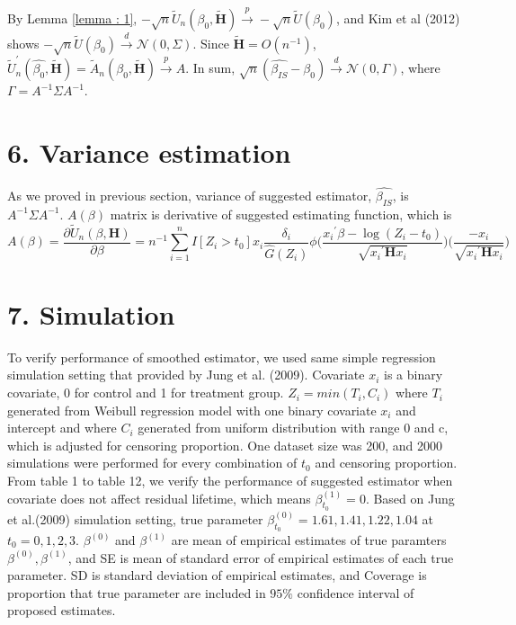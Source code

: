 \documentclass[12pt]{article}
\begin{document}
	\noindent By Lemma \ref {lemma : 1}, $-\sqrt{n}\tilde{U}_n(\beta_0, \tilde{\textbf{H}}) \xrightarrow{p} -\sqrt{n}\tilde{U}(\beta_0)$, and Kim et al (2012) shows $-\sqrt{n}\tilde{U}(\beta_0) \xrightarrow{d} \mathcal{N}(0,\Sigma)$. Since $\tilde{\textbf{H}}=O(n^{-1})$, $\tilde{U}_n^{\prime}(\hat{\beta_0},\tilde{\textbf{H}})=\tilde{A}_n(\beta_0, \tilde{\textbf{H}}) \xrightarrow{p} A$. In sum,
	$\sqrt{n}(\hat{\beta_{IS}}-\beta_0) \xrightarrow{d} \mathcal{N}(0,\Gamma)$, where $\Gamma = A^{-1}\Sigma A^{-1}$.

\section{6. Variance estimation}
	As we proved in previous section, variance of suggested estimator, $\hat{\beta_{IS}}$, is $A^{-1}\Sigma A^{-1}$. $A(\beta)$ matrix is derivative of suggested estimating function, which is
	\begin{equation}
	A(\beta) = \frac{\partial \tilde{U}_n(\beta, \textbf{H})}{\partial \beta} = n^{-1}\sum_{i=1}^{n} I[Z_i>t_0] x_i \frac{\delta_i}{\hat{G}(Z_i)} \phi\bigg(\frac{{x_i}^{\prime}\beta-\log(Z_i-t_0)}{\sqrt{{x_i}^{\prime}\textbf{H} x_i}}\bigg)\bigg(\frac{-{x_i}}{\sqrt{{x_i}^{\prime}\textbf{H} {x_i}}}\bigg)
	\end{equation}
\section{7. Simulation}
	To verify performance of smoothed estimator, we used same simple regression simulation setting that provided by Jung et al. (2009). Covariate $x_i$ is a binary covariate, 0 for control and 1 for treatment group. $Z_i = min(T_i, C_i)$ where $T_i$ generated from Weibull regression model with one binary covariate $x_i$ and intercept and where $C_i$ generated from uniform distribution with range 0 and c, which is adjusted for censoring proportion. One dataset size was 200, and 2000 simulations were performed for every combination of $t_0$ and censoring proportion.
	From table 1 to table 12, we verify the performance of suggested estimator when covariate does not affect residual lifetime, which means $\beta_{t_0}^{(1)} = 0$. Based on Jung et al.(2009) simulation setting, true parameter $\beta_{t_0}^{(0)} = 1.61, 1.41, 1.22, 1.04$ at $t_0 = 0, 1, 2, 3$. $\beta^(0)$ and $\beta^(1)$ are mean of empirical estimates of true paramters $\beta^(0), \beta^(1)$, and SE is mean of standard error of empirical estimates of each true parameter. SD is standard deviation of empirical estimates, and Coverage is proportion that true parameter are included in $95\%$ confidence interval of proposed estimates. 
	
\end{document}
